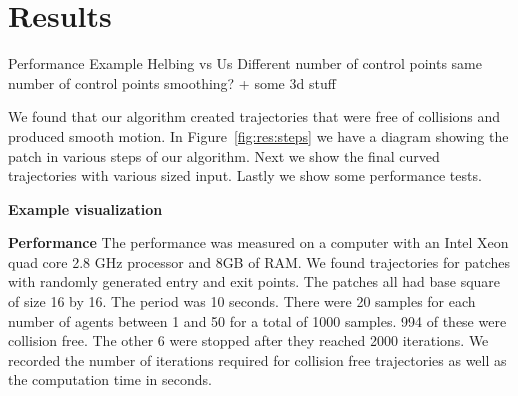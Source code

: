 \section{Results}
\label{sec:results}

Performance
Example
Helbing vs Us
Different number of control points
same number of control points
smoothing?
+ some 3d stuff



We found that our algorithm created trajectories that were free of collisions and produced smooth motion. In Figure~\ref{fig:res:steps} we have a diagram showing the patch in various steps of our algorithm. Next we show the final curved trajectories with various sized input. Lastly we show some performance tests.


\textbf{Example visualization}



\textbf{Performance}
The performance was measured on a computer with an Intel Xeon quad core 2.8 GHz processor and 8GB of RAM. We found trajectories for patches with randomly generated entry and exit points. The patches all had base square of size 16 by 16. The period was 10 seconds. There were 20 samples for each number of agents between 1 and 50 for a total of 1000 samples. 994 of these were collision free. The other 6 were stopped after they reached 2000 iterations. We recorded the number of iterations required for collision free trajectories as well as the computation time in seconds.


